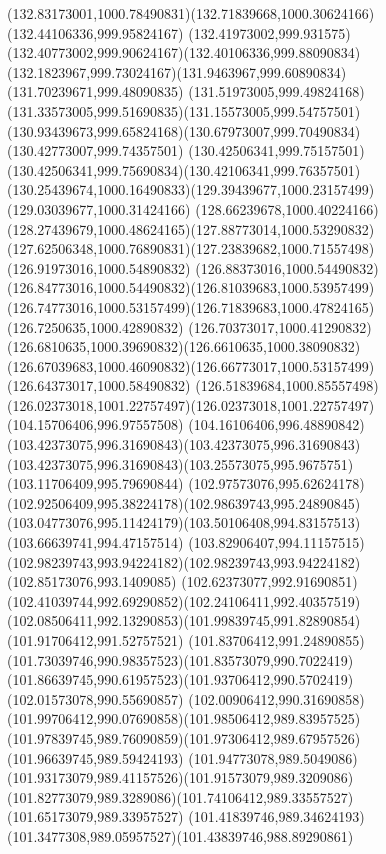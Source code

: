 {{	\curveto(132.83173001,1000.78490831)(132.71839668,1000.30624166)(132.44106336,999.95824167)
	\curveto(132.41973002,999.931575)(132.40773002,999.90624167)(132.40106336,999.88090834)
	\curveto(132.1823967,999.73024167)(131.9463967,999.60890834)(131.70239671,999.48090835)
	\curveto(131.51973005,999.49824168)(131.33573005,999.51690835)(131.15573005,999.54757501)
	\curveto(130.93439673,999.65824168)(130.67973007,999.70490834)(130.42773007,999.74357501)
	\curveto(130.42506341,999.75157501)(130.42506341,999.75690834)(130.42106341,999.76357501)
	\curveto(130.25439674,1000.16490833)(129.39439677,1000.23157499)(129.03039677,1000.31424166)
	\curveto(128.66239678,1000.40224166)(128.27439679,1000.48624165)(127.88773014,1000.53290832)
	\curveto(127.62506348,1000.76890831)(127.23839682,1000.71557498)(126.91973016,1000.54890832)
	\curveto(126.88373016,1000.54490832)(126.84773016,1000.54490832)(126.81039683,1000.53957499)
	\curveto(126.74773016,1000.53157499)(126.71839683,1000.47824165)(126.7250635,1000.42890832)
	\curveto(126.70373017,1000.41290832)(126.6810635,1000.39690832)(126.6610635,1000.38090832)
	\curveto(126.67039683,1000.46090832)(126.66773017,1000.53157499)(126.64373017,1000.58490832)
	\curveto(126.51839684,1000.85557498)(126.02373018,1001.22757497)(126.02373018,1001.22757497)
	\lineto(104.15706406,996.97557508)
	\curveto(104.16106406,996.48890842)(103.42373075,996.31690843)(103.42373075,996.31690843)
	\curveto(103.42373075,996.31690843)(103.25573075,995.9675751)(103.11706409,995.79690844)
	\curveto(102.97573076,995.62624178)(102.92506409,995.38224178)(102.98639743,995.24890845)
	\curveto(103.04773076,995.11424179)(103.50106408,994.83157513)(103.66639741,994.47157514)
	\curveto(103.82906407,994.11157515)(102.98239743,993.94224182)(102.98239743,993.94224182)
	\lineto(102.85173076,993.1409085)
	\curveto(102.62373077,992.91690851)(102.41039744,992.69290852)(102.24106411,992.40357519)
	\curveto(102.08506411,992.13290853)(101.99839745,991.82890854)(101.91706412,991.52757521)
	\curveto(101.83706412,991.24890855)(101.73039746,990.98357523)(101.83573079,990.7022419)
	\curveto(101.86639745,990.61957523)(101.93706412,990.5702419)(102.01573078,990.55690857)
	\curveto(102.00906412,990.31690858)(101.99706412,990.07690858)(101.98506412,989.83957525)
	\curveto(101.97839745,989.76090859)(101.97306412,989.67957526)(101.96639745,989.59424193)
	\curveto(101.94773078,989.5049086)(101.93173079,989.41157526)(101.91573079,989.3209086)
	\curveto(101.82773079,989.3289086)(101.74106412,989.33557527)(101.65173079,989.33957527)
	\curveto(101.41839746,989.34624193)(101.3477308,989.05957527)(101.43839746,988.89290861)
}}
